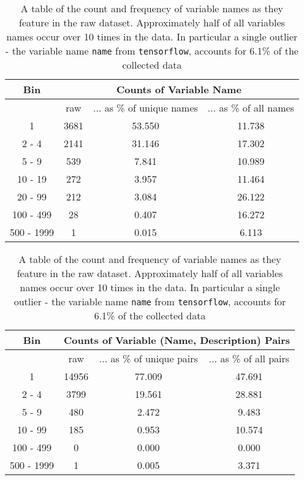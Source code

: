 \begin{table}[p]
    \begin{center}
    \begin{tabular}{c | c | c | c  }       
     Bin   & \multicolumn{3}{c}{Counts of Variable Name}   \\
    \hline
     &     raw &... as \% of unique names & ... as \% of all names   \\  
    \hline     
     1     &      3681 &   53.550 &   11.738  \\          
     2 - 4 &      2141 &   31.146 &   17.302  \\          
     5 - 9 &       539 &    7.841 &   10.989  \\          
     10 - 19 &     272 &    3.957 &   11.464  \\          
     20 - 99 &     212 &    3.084 &   26.122  \\          
     100 - 499 &    28 &    0.407 &   16.272  \\          
     500 - 1999 &    1 &    0.015 &    6.113  \\                

    \end{tabular}
        \caption { A table of the count and frequency of variable names as they feature in the raw dataset. Approximately half of all variables names occur over 10 times in the data. In particular a single outlier - the variable name \texttt{name} from \texttt{tensorflow}, accounts for 6.1\% of the collected data}
    \label{table:variable_histogram}

    \begin{tabular}{c | c | c | c  }       

     Bin   & \multicolumn{3}{c}{Counts of Variable (Name, Description) Pairs}  \\
    \hline
     &     raw &... as \% of unique pairs & ... as \% of all pairs  \\  
    \hline     
    1 &     14956 &   77.009 &   47.691  \\
    2 - 4 &      3799 &   19.561 &   28.881 \\
    5 - 9 &       480 &    2.472 &    9.483 \\
    10 - 99 &     185 &    0.953 &   10.574 \\
    100 - 499 &     0 &    0.000 &    0.000 \\
    500 - 1999 &    1 &    0.005 &    3.371 \\           


\end{tabular}
\end{center}
\end{table}
